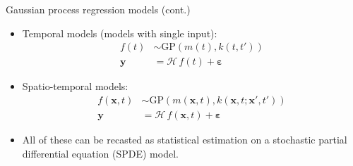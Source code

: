 \documentclass[first=dgreen,second=purple,presentation]{elecslides}
\begin{document}
\begin{frame}{Gaussian process regression models (cont.)}

 \begin{itemize}[<+->]
 \item \alert{Temporal} models (models with single input):
\begin{equation}
\begin{split}
  f(t) &\sim \mathrm{GP}(m(t),k(t,t')) \\
  \mathbf{y} &= \boldsymbol{\mathcal{H}} \, f(t) + \boldsymbol{\varepsilon} %
\end{split}
\nonumber
\end{equation}
 
\item \alert{Spatio-temporal} models:
\begin{equation}
\begin{split}
  f(\mathbf{x},t) &\sim \mathrm{GP}(m(\mathbf{x},t),k(\mathbf{x},t;\mathbf{x}',t')) \\
  \mathbf{y} &= \boldsymbol{\mathcal{H}} \, f(\mathbf{x},t) + \boldsymbol{\varepsilon} %
\end{split}
\nonumber
\end{equation}

\item All of these can be recasted as \alert{statistical estimation on a stochastic partial differential equation (SPDE) model}.

\end{itemize}
\end{frame}
\end{document}
